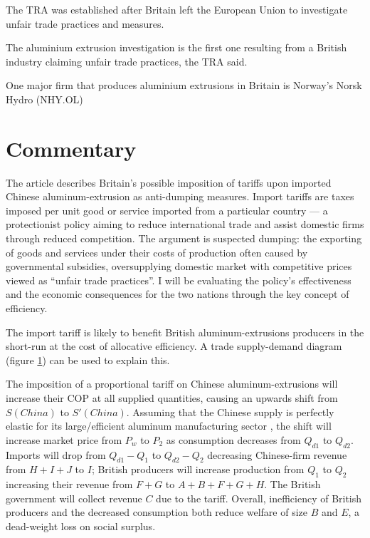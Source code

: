\documentclass[a4paper,12pt]{article}
\newcommand{\tikzfig}[1]{}
\begin{document}
The TRA was established after Britain left the European Union to investigate unfair trade practices and measures.

The aluminium extrusion investigation is the first one resulting from a British industry claiming unfair trade practices, the TRA said.

One major firm that produces aluminium extrusions in Britain is Norway's Norsk Hydro (NHY.OL)

\newpage
\section*{Commentary}


The article describes Britain's possible imposition of tariffs upon imported Chinese aluminum-extrusion as anti-dumping measures. Import tariffs are taxes imposed per unit good or service imported from a particular country --- a protectionist policy aiming to reduce international trade and assist domestic firms through reduced competition. The argument is suspected dumping: the exporting of goods and services under their costs of production often caused by governmental subsidies, oversupplying domestic market with competitive prices viewed as ``unfair trade practices''. I will be evaluating the policy's effectiveness and the economic consequences for the two nations through the key concept of efficiency.

The import tariff is likely to benefit British aluminum-extrusions producers in the short-run at the cost of allocative efficiency. A trade supply-demand diagram (figure \ref{fig:tariff}) can be used to explain this.

\begin{figure}[H]
	\centering
	 \tikzfig{assets/tariffs.txt}
	\caption{}
	\label{fig:tariff}
\end{figure}

The imposition of a proportional tariff on Chinese aluminum-extrusions will increase their COP at all supplied quantities, causing an upwards shift from $S(China)$ to $S'(China)$. Assuming that the Chinese supply is perfectly elastic for its large/efficient aluminum manufacturing sector \parencite{ilzetzki_2022}, the shift will increase market price from $P_w$ to $P_2$ as consumption decreases from $Q_{d1}$ to $Q_{d2}$.
Imports will drop from $Q_{d1}-Q_{1}$ to $Q_{d2}-Q_{2}$ decreasing Chinese-firm revenue from $H+I+J$ to $I$; British producers will increase production from $Q_1$ to $Q_2$ increasing their revenue from $F+G$ to $A+B+F+G+H$. The British government will collect revenue $C$ due to the tariff. Overall, inefficiency of British producers and the decreased consumption both reduce welfare of size $B$ and $E$, a dead-weight loss on social surplus.
\end{document}
